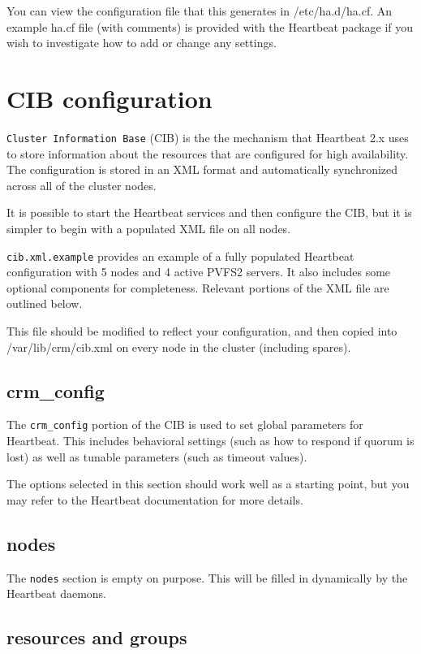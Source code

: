 \documentclass[11pt]{article}
\begin{document}
You can view the configuration file that this generates in
/etc/ha.d/ha.cf.  An example ha.cf file (with comments) is provided with
the Heartbeat package if you wish to investigate how to add or change any settings.

\section{CIB configuration}

\texttt{Cluster Information Base} (CIB) is the the mechanism that
Heartbeat 2.x uses to store information about the resources that are 
configured for high availability.  The configuration is stored in an
XML format and automatically synchronized across all of the cluster
nodes.

It is possible to start the Heartbeat services and then configure the
CIB, but it is simpler to begin with a populated XML file on all nodes.

\texttt{cib.xml.example} provides an example of a fully populated
Heartbeat configuration with 5 nodes and 4 active PVFS2 servers.  It
also includes some optional components for completeness.  Relevant
portions of the XML file are outlined below.

This file should be modified to reflect your configuration, and then
copied into /var/lib/crm/cib.xml on every node in the cluster (including
spares).

\subsection{crm\_config}

The \texttt{crm\_config} portion of the CIB is used to set global
parameters for Heartbeat.  This includes behavioral settings
(such as how to respond if quorum is lost) as well as tunable parameters
(such as timeout values).

The options selected in this section should work well as a starting
point, but you may refer to the Heartbeat documentation for more
details.

\subsection{nodes}

The \texttt{nodes} section is empty on purpose.  This will be filled in
dynamically by the Heartbeat daemons.

\subsection{resources and groups}
\end{document}
